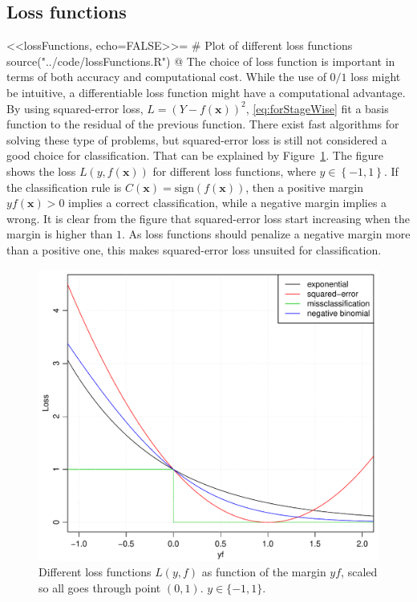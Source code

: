 \subsection{Loss functions}
\label{sub:Loss functions}
<<lossFunctions, echo=FALSE>>=
# Plot of different loss functions
source("../code/lossFunctions.R")
@
The choice of loss function is important in terms of both accuracy and computational cost. While the use of $0/1$ loss might be intuitive, a differentiable loss function might have a computational advantage. By using squared-error loss, $L = (Y - f(\mathbf{x}))^2$, \eqref{eq:forStageWise} fit a basis function to the residual of the previous function. There exist fast algorithms for solving these type of problems, but squared-error loss is still not considered a good choice for classification. That can be explained by Figure~\ref{fig:lossFunctions}. The figure shows the loss $L(y, f(\mathbf{x}))$ for different loss functions, where $y \in \left\{ -1, 1 \right\}$. If the classification rule is $C(\mathbf{x}) = \mathrm{sign}(f(\mathbf{x}))$, then a positive margin $y f(\mathbf{x}) > 0$ implies a correct classification, while a negative margin implies a wrong. It is clear from the figure that squared-error loss start increasing when the margin is higher than $1$. As loss functions should penalize a negative margin more than a positive one, this makes squared-error loss unsuited for classification.
%
\begin{figure}[h!tp]
\begin{center}
    \includegraphics[scale=0.5]{./figures/lossFunctions.pdf}
\end{center}
\caption{Different loss functions $L(y, f)$ as function of the margin $yf$, scaled so all goes through point $(0, 1)$. $y \in \{-1, 1\}$.}
\label{fig:lossFunctions}
\end{figure}
%

